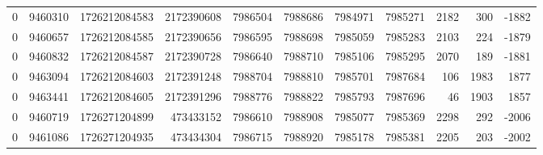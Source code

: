 \begin{tabular}{rrrrrrrrrrr}
0 & 9460310 & 1726212084583 & 2172390608 & 7986504 & 7988686 & 7984971 & 7985271 & 2182 & 300 & -1882 \\
0 & 9460657 & 1726212084585 & 2172390656 & 7986595 & 7988698 & 7985059 & 7985283 & 2103 & 224 & -1879 \\
0 & 9460832 & 1726212084587 & 2172390728 & 7986640 & 7988710 & 7985106 & 7985295 & 2070 & 189 & -1881 \\
0 & 9463094 & 1726212084603 & 2172391248 & 7988704 & 7988810 & 7985701 & 7987684 & 106 & 1983 & 1877 \\
0 & 9463441 & 1726212084605 & 2172391296 & 7988776 & 7988822 & 7985793 & 7987696 & 46 & 1903 & 1857 \\
0 & 9460719 & 1726271204899 & 473433152 & 7986610 & 7988908 & 7985077 & 7985369 & 2298 & 292 & -2006 \\
0 & 9461086 & 1726271204935 & 473434304 & 7986715 & 7988920 & 7985178 & 7985381 & 2205 & 203 & -2002 \\
\bottomrule
\end{tabular}
